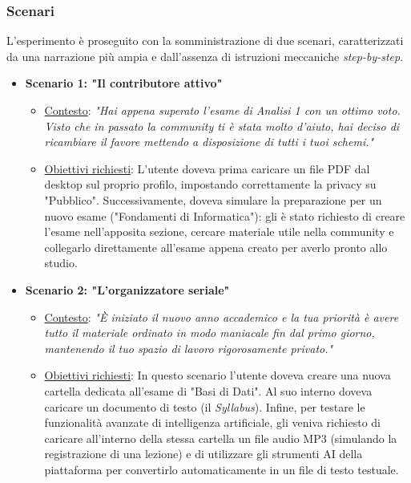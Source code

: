 \subsubsection{Scenari}
L'esperimento è proseguito con la somministrazione di due scenari, caratterizzati da una narrazione più ampia e dall'assenza di istruzioni meccaniche \textit{step-by-step}.

\begin{itemize}
    \item \textbf{Scenario 1: "Il contributore attivo"}
        \begin{itemize}
            \item \underline{Contesto}: \textit{"Hai appena superato l'esame di Analisi 1 con un ottimo voto. Visto che in passato la community ti è stata molto d'aiuto, hai deciso di ricambiare il favore mettendo a disposizione di tutti i tuoi schemi."}
            \item \underline{Obiettivi richiesti}: L'utente doveva prima caricare un file PDF dal desktop sul proprio profilo, impostando correttamente la privacy su "Pubblico". Successivamente, doveva simulare la preparazione per un nuovo esame ("Fondamenti di Informatica"): gli è stato richiesto di creare l'esame nell'apposita sezione, cercare materiale utile nella community e collegarlo direttamente all'esame appena creato per averlo pronto allo studio.
        \end{itemize}
    \item \textbf{Scenario 2: "L'organizzatore seriale"}
        \begin{itemize}
            \item \underline{Contesto}: \textit{"È iniziato il nuovo anno accademico e la tua priorità è avere tutto il materiale ordinato in modo maniacale fin dal primo giorno, mantenendo il tuo spazio di lavoro rigorosamente privato."}
            \item \underline{Obiettivi richiesti}: In questo scenario l'utente doveva creare una nuova cartella dedicata all'esame di "Basi di Dati". Al suo interno doveva caricare un documento di testo (il \textit{Syllabus}). Infine, per testare le funzionalità avanzate di intelligenza artificiale, gli veniva richiesto di caricare all'interno della stessa cartella un file audio MP3 (simulando la registrazione di una lezione) e di utilizzare gli strumenti AI della piattaforma per convertirlo automaticamente in un file di testo testuale.
        \end{itemize}
\end{itemize}
